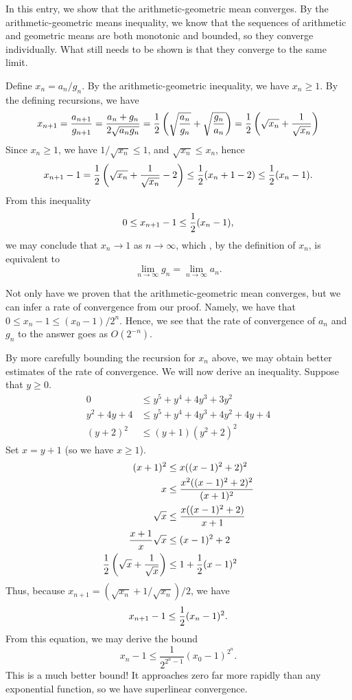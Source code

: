 \documentclass[12pt]{article}
\begin{document}
In this entry, we show that the arithmetic-geometric mean converges.
By the arithmetic-geometric means inequality, we know that the sequences 
of arithmetic and geometric means are both monotonic and bounded, so
they converge individually.  What still needs to be shown is that they 
converge to the same limit.

Define $x_n = a_n / g_n$.  By the arithmetic-geometric inequality, we
have $x_n \ge 1$.  By the defining recursions, we have
\[
x_{n+1} =
{a_{n+1} \over g_{n+1}} =
{a_n + g_n \over 2 \sqrt{a_n g_n}} =
{1 \over 2}
\left(
\sqrt{a_n \over g_n} + \sqrt{g_n \over a_n}
\right) =
{1 \over 2}
\left(
\sqrt{x_n} + 
{1 \over \sqrt{x_n}}
\right)
\]
Since $x_n \ge 1$, we have $1 / \sqrt{x_n} \le 1$, and $\sqrt{x_n} \le x_n$, hence
\[
x_{n+1} - 1 =
{1 \over 2}
\left(
\sqrt{x_n} + 
{1 \over \sqrt{x_n}}
-2
\right) \le
{1 \over 2}
({x_n} + 1-2) \le
{1 \over 2}
(x_n - 1) .
\]
From this inequality
\[
0 \le x_{n+1} - 1 \le
{1 \over 2} (x_n - 1) ,
\]
we may conclude that $x_n \to 1$ as $n \to \infty$, which , by the definition of $x_n$,
is equivalent to
\[
\lim_{n \to \infty} g_n =
\lim_{n \to \infty} a_n .
\]

Not only have we proven that the arithmetic-geometric mean converges, but we can infer
a rate of convergence from our proof.  Namely, we have that $0 \le x_n - 1 \le (x_0 - 1) 
/ 2^n$.  Hence, we see that the rate of convergence of $a_n$ and $g_n$ to the answer goes
as $O(2^{-n})$.

By more carefully bounding the recursion for $x_n$ above, we may obtain better estimates
of the rate of convergence.  We will now derive an inequality. Suppose that $y \ge 0$.
\begin{align*}
0 &\le y^5 + y^4 + 4 y^3 + 3 y^2 \\
y^2 + 4 y + 4 &\le y^5 + y^4 + 4 y^3 + 4 y^2 + 4 y + 4 \\
(y + 2)^2 &\le (y + 1) (y^2 + 2)^2
\end{align*}
Set $x = y + 1$ (so we have $x \ge 1$).
\begin{align*}
(x + 1)^2 &\le x ( (x - 1)^2 + 2)^2 \\
x &\le {x^2 ( (x - 1)^2 + 2)^2 \over (x + 1)^2} \\
\sqrt{x} &\le {x ((x - 1)^2 + 2) \over x + 1} \\
{x + 1 \over x} \sqrt{x} &\le (x - 1)^2 + 2 \\
{1 \over 2}
\left(
\sqrt{x} + {1 \over \sqrt{x}}
\right) &\le
1 + {1 \over 2} (x - 1)^2
\end{align*}
Thus, because $x_{n+1} = (\sqrt{x_n} + 1 /\sqrt{x_n})/2$, we have
\[
x_{n+1} - 1 \le {1 \over 2} (x_n - 1)^2 .
\]
From this equation, we may derive the bound
\[
x_n -1 \le \frac{1}{2^{2^n-1}} (x_0 - 1)^{2^n} .
\]
This is a much better bound!  It approaches zero far more rapidly
than any exponential function, so we have superlinear convergence.
\end{document}
